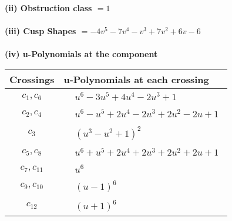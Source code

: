 \documentclass[1p]{elsarticle_modified}
\theoremstyle{definition}
\begin{document}
\flushleft \textbf{(ii) Obstruction class $= 1$}\\~\\
\flushleft \textbf{(iii) Cusp Shapes $= -4 v^5-7 v^4- v^3+7 v^2+6 v-6$}\\~\\
\newpage\renewcommand{\arraystretch}{1}
\flushleft \textbf{(iv) u-Polynomials at the component}\newline \\
\begin{tabular}{m{50pt}|m{274pt}}
Crossings & \hspace{64pt}u-Polynomials at each crossing \\
\hline $$\begin{aligned}c_{1},c_{6}\end{aligned}$$&$\begin{aligned}
&u^6-3 u^5+4 u^4-2 u^3+1
\end{aligned}$\\
\hline $$\begin{aligned}c_{2},c_{4}\end{aligned}$$&$\begin{aligned}
&u^6- u^5+2 u^4-2 u^3+2 u^2-2 u+1
\end{aligned}$\\
\hline $$\begin{aligned}c_{3}\end{aligned}$$&$\begin{aligned}
&(u^3- u^2+1)^2
\end{aligned}$\\
\hline $$\begin{aligned}c_{5},c_{8}\end{aligned}$$&$\begin{aligned}
&u^6+u^5+2 u^4+2 u^3+2 u^2+2 u+1
\end{aligned}$\\
\hline $$\begin{aligned}c_{7},c_{11}\end{aligned}$$&$\begin{aligned}
&u^6
\end{aligned}$\\
\hline $$\begin{aligned}c_{9},c_{10}\end{aligned}$$&$\begin{aligned}
&(u-1)^6
\end{aligned}$\\
\hline $$\begin{aligned}c_{12}\end{aligned}$$&$\begin{aligned}
&(u+1)^6
\end{aligned}$\\
\hline
\end{tabular}\\~\\
\end{document}
